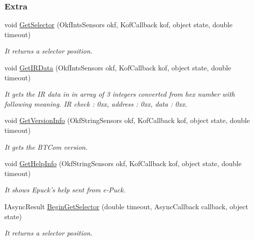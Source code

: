 \subsubsection*{Extra} %
\label{ssub:Extra}
  \begin{DoxyCompactItemize}

  \item  void \hyperlink{class_elib_1_1_epuck_a40c8bc92b67a20c3fdf891997eaf03c5}{GetSelector} (OkfIntsSensors okf, KofCallback kof, object state, double timeout)
  \begin{DoxyCompactList}\small\item\em It returns a selector position. \item\end{DoxyCompactList}

  \item   void \hyperlink{class_elib_1_1_epuck_ad74c7a6d5618da33d84aee5666d990c5}{GetIRData} (OkfIntsSensors okf, KofCallback kof, object state, double timeout)
  \begin{DoxyCompactList}\small\item\em It gets the IR data in in array of 3 integers converted from hex number with following meaning. IR check : 0xx, address : 0xx, data : 0xx. \item\end{DoxyCompactList}

  \item   void \hyperlink{class_elib_1_1_epuck_aa7ed3e58936ccd1d52596b318d5ddccc}{GetVersionInfo} (OkfStringSensors okf, KofCallback kof, object state, double timeout)
  \begin{DoxyCompactList}\small\item\em It gets the BTCom version. \item\end{DoxyCompactList}

  \item   void \hyperlink{class_elib_1_1_epuck_a1569f01c2a34bb335d2f7a12c94de891}{GetHelpInfo} (OkfStringSensors okf, KofCallback kof, object state, double timeout)
  \begin{DoxyCompactList}\small\item\em It shows Epuck's help sent from e-\/Puck. \item\end{DoxyCompactList}

  \item   IAsyncResult \hyperlink{class_elib_1_1_epuck_a23a675feab78848b194cb49a01a30463}{BeginGetSelector} (double timeout, AsyncCallback callback, object state)
  \begin{DoxyCompactList}\small\item\em It returns a selector position. \item\end{DoxyCompactList}


\end{DoxyCompactItemize}
